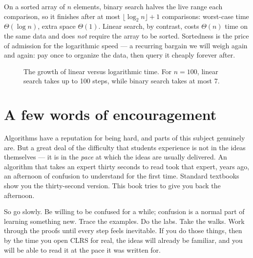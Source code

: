 \begin{complexitybox}
On a sorted array of $n$ elements, binary search halves the live range each
comparison, so it finishes after at most $\lfloor\log_2 n\rfloor + 1$ comparisons:
worst-case time $\Theta(\log n)$, extra space $\Theta(1)$. Linear search, by
contrast, costs $\Theta(n)$ time on the same data and does \emph{not} require the
array to be sorted. Sortedness is the price of admission for the logarithmic
speed --- a recurring bargain we will weigh again and again: pay once to organize
the data, then query it cheaply forever after.
\end{complexitybox}

\begin{figure}[htbp]
\centering
{}
\caption{The growth of linear versus logarithmic time. For $n=100$, linear search takes up to 100 steps, while binary search takes at most 7.}
\label{fig:ch00-growth}
\end{figure}

\section*{A few words of encouragement}

Algorithms have a reputation for being hard, and parts of this subject genuinely
are. But a great deal of the difficulty that students experience is not in the
ideas themselves --- it is in the \emph{pace} at which the ideas are usually
delivered. An algorithm that takes an expert thirty seconds to read took that
expert, years ago, an afternoon of confusion to understand for the first time.
Standard textbooks show you the thirty-second version. This book tries to give you
back the afternoon.

So go slowly. Be willing to be confused for a while; confusion is a normal part
of learning something new. Trace the examples.
Do the labs. Take the walks. Work through the proofs until every step feels
inevitable. If you do those things, then by the time you open CLRS for real, the
ideas will already be familiar, and you will be able to read it at the pace it was
written for.

